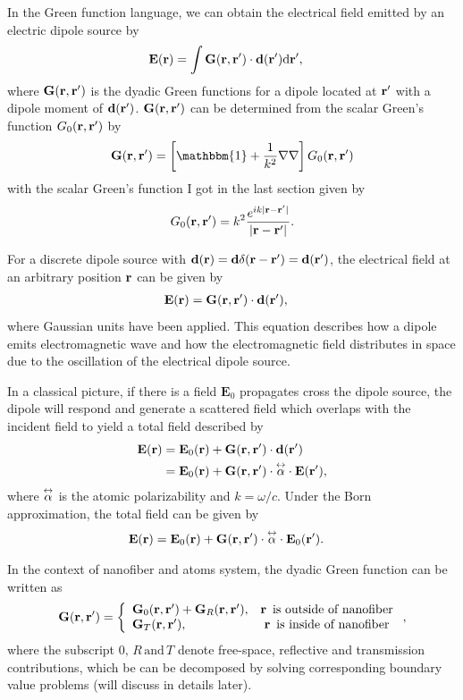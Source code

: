 In the Green function language, we can obtain the electrical field emitted by an electric dipole source by
\begin{align}\label{EGd}
\mathbf{E}(\br) &=  \int\mathbf{G}(\br,\br')\cdot \mathbf{d}(\br') \mathrm{d}\br', 
\end{align}
where $ \mathbf{G}(\mathbf{r},\mathbf{r}') $ is the dyadic Green functions for a dipole located at $ \mathbf{r}' $ with a dipole moment of $ \mathbf{d}(\mathbf{r}') $. $\mathbf{G}(\mathbf{r},\mathbf{r}')$ can be determined from the scalar Green's function $G_0(\mathbf{r},\mathbf{r}')$ by 
\begin{align}
\mathbf{G}(\br,\br') = \left[\mathbbm{1} + \frac{1}{k^2}\nabla\nabla \right]G_0(\br,\br')
\end{align}
with the scalar Green's function I got in the last section given by
\begin{align}\label{scalarG}
G_0(\br,\br') = k^2\frac{e^{ik|\br-\br'|}}{|\br-\br'|}. 
\end{align}

For a discrete dipole source with $ \mathbf{d}(\mathbf{r})= \mathbf{d}\delta(\mathbf{r}-\mathbf{r}') = \mathbf{d}(\mathbf{r}')  $, the electrical field at an arbitrary position $\mathbf{r}$ can be given by
\begin{align}
 \mathbf{E}(\mathbf{r}) &= \mathbf{G}(\mathbf{r},\mathbf{r}')\cdot \mathbf{d}(\mathbf{r}'), 
\end{align}
where Gaussian units have been applied. This equation describes how a dipole emits electromagnetic wave and how the electromagnetic field distributes in space due to the oscillation of the electrical dipole source. 

In a classical picture, if there is a field $ \mathbf{E}_0 $ propagates cross the dipole source, the dipole will respond and generate a scattered field which overlaps with the incident field to yield a total field described by
\begin{align}
\mathbf{E}(\mathbf{r}) &= \mathbf{E}_0(\mathbf{r})+\mathbf{G}(\mathbf{r},\mathbf{r}')\cdot \mathbf{d}(\mathbf{r}')\\
&=\mathbf{E}_0(\mathbf{r})+ \mathbf{G}(\mathbf{r},\mathbf{r}')\cdot \overset{\leftrightarrow}{\alpha}\cdot \mathbf{E}(\mathbf{r}'),
\end{align}
where $ \overset{\leftrightarrow}{\alpha} $ is the atomic polarizability and $ k=\omega/c $. Under the Born approximation, the total field can be given by
\begin{align}
\mathbf{E}(\br) 
&=\mathbf{E}_0(\br)+ \mathbf{G}(\br,\br')\cdot \tensor{\alpha}\cdot \mathbf{E}_0(\br').\label{eq:EoutG}
\end{align}

In the context of nanofiber and atoms system, the dyadic Green function can be written as
\begin{align}
\mathbf{G}(\mathbf{r},\mathbf{r}') = \left\{ 
\begin{array}{lc}
\mathbf{G}_0(\mathbf{r},\mathbf{r}')+\mathbf{G}_R(\mathbf{r},\mathbf{r}'), & \mathbf{r} \, \text{ is outside of nanofiber}\\
\mathbf{G}_T(\mathbf{r},\mathbf{r}'), & \mathbf{r} \, \text{ is inside of nanofiber}
\end{array}\right.,
\end{align}
where the subscript $ 0,\,R\,\text{and}\,T $ denote free-space, reflective and transmission contributions, which be can be decomposed by solving corresponding boundary value problems (will discuss in details later).
 
